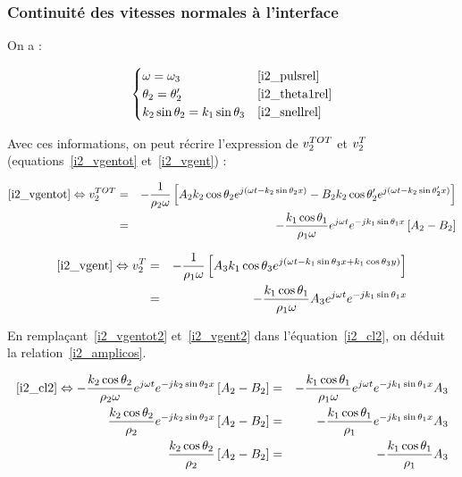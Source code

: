 \subsubsection{Continuité des vitesses normales à l'interface}

On a :

\begin{equation*}
    \begin{cases}
        \omega = \omega_3 & \eqref{i2_pulsrel}\\
        \theta_2 = \theta_2' & \eqref{i2_theta1rel} \\
        k_2\sin\theta_2 = k_1\sin\theta_3  & \eqref{i2_snellrel}
    \end{cases}
\end{equation*}

Avec ces informations, on peut récrire l'expression de $v^{TOT}_2$ et $v^T_2$ (equations~\eqref{i2_vgentot}
et~\eqref{i2_vgent}) :

\begin{eqnarray}
    \eqref{i2_vgentot}  \Leftrightarrow v^{TOT}_2 & = & -\frac{1}{\rho_2\omega}\left[A_2k_2\cos\theta_2e^{j(\omega t-k_2\sin\theta_2x)} -
            B_2k_2\cos\theta_2'e^{j(\omega t-k_2\sin\theta_2'x)}\right] \notag\\
            & = & -\frac{k_1\cos\theta_1}{\rho_1\omega}e^{j\omega t}e^{-jk_1\sin\theta_1x}\left[A_2 - B_2\right] \label{i2_vgentot2}
\end{eqnarray}

\begin{eqnarray}
    \eqref{i2_vgent} \Leftrightarrow v^T_2 & = &
    -\frac{1}{\rho_1\omega}\left[A_3k_1\cos\theta_3e^{j(\omega t-k_1\sin\theta_3x+k_1\cos\theta_3y)}\right]\notag\\
    & = & -\frac{k_1\cos\theta_1}{\rho_1\omega}A_3e^{j\omega t}e^{-jk_1\sin\theta_1x}\label{i2_vgent2}
\end{eqnarray}

En remplaçant~\eqref{i2_vgentot2} et~\eqref{i2_vgent2} dans l'équation~\eqref{i2_cl2}, on déduit la relation~\eqref{i2_amplicos}.

\begin{eqnarray}
        \eqref{i2_cl2} \Leftrightarrow -\frac{k_2\cos\theta_2}{\rho_2\omega}e^{j\omega t}e^{-jk_2\sin\theta_2x}\left[A_2 - B_2\right] & =
            & -\frac{k_1\cos\theta_1}{\rho_1\omega}e^{j\omega t}e^{-jk_1\sin\theta_1x}A_3\notag\\
        \frac{k_2\cos\theta_2}{\rho_2}e^{-jk_2\sin\theta_2x}\left[A_2 - B_2\right] & =
            & -\frac{k_1\cos\theta_1}{\rho_1}e^{-jk_1\sin\theta_1x}A_3\notag\\
        \frac{k_2\cos\theta_2}{\rho_2}\left[A_2 - B_2\right] & =
    & -\frac{k_1\cos\theta_1}{\rho_1}A_3\label{i2_amplicos}
\end{eqnarray}

